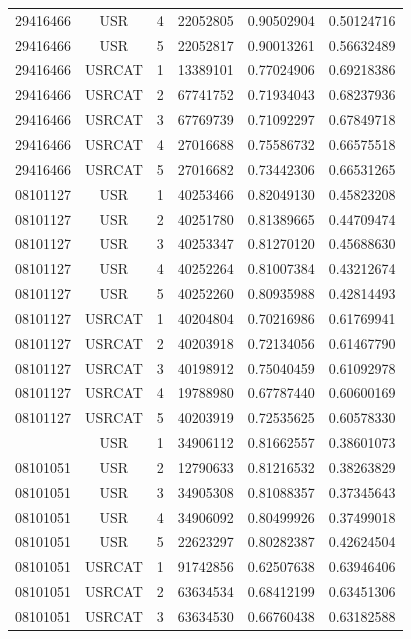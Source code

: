 \begin{longtable}{cccccc}
29416466 & USR    & 4 & 22052805 & 0.90502904 & 0.50124716\\
29416466 & USR    & 5 & 22052817 & 0.90013261 & 0.56632489\\
29416466 & USRCAT & 1 & 13389101 & 0.77024906 & 0.69218386\\%
29416466 & USRCAT & 2 & 67741752 & 0.71934043 & 0.68237936\\
29416466 & USRCAT & 3 & 67769739 & 0.71092297 & 0.67849718\\
29416466 & USRCAT & 4 & 27016688 & 0.75586732 & 0.66575518\\
29416466 & USRCAT & 5 & 27016682 & 0.73442306 & 0.66531265\\
\hline
08101127 & USR    & 1 & 40253466 & 0.82049130 & 0.45823208\\%
08101127 & USR    & 2 & 40251780 & 0.81389665 & 0.44709474\\
08101127 & USR    & 3 & 40253347 & 0.81270120 & 0.45688630\\
08101127 & USR    & 4 & 40252264 & 0.81007384 & 0.43212674\\
08101127 & USR    & 5 & 40252260 & 0.80935988 & 0.42814493\\
08101127 & USRCAT & 1 & 40204804 & 0.70216986 & 0.61769941\\%
08101127 & USRCAT & 2 & 40203918 & 0.72134056 & 0.61467790\\
08101127 & USRCAT & 3 & 40198912 & 0.75040459 & 0.61092978\\
08101127 & USRCAT & 4 & 19788980 & 0.67787440 & 0.60600169\\
08101127 & USRCAT & 5 & 40203919 & 0.72535625 & 0.60578330\\
\hline
\pagebreak
08101051 & USR    & 1 & 34906112 & 0.81662557 & 0.38601073\\%
08101051 & USR    & 2 & 12790633 & 0.81216532 & 0.38263829\\
08101051 & USR    & 3 & 34905308 & 0.81088357 & 0.37345643\\
08101051 & USR    & 4 & 34906092 & 0.80499926 & 0.37499018\\
08101051 & USR    & 5 & 22623297 & 0.80282387 & 0.42624504\\
08101051 & USRCAT & 1 & 91742856 & 0.62507638 & 0.63946406\\%
08101051 & USRCAT & 2 & 63634534 & 0.68412199 & 0.63451306\\
08101051 & USRCAT & 3 & 63634530 & 0.66760438 & 0.63182588\\

\end{longtable}
